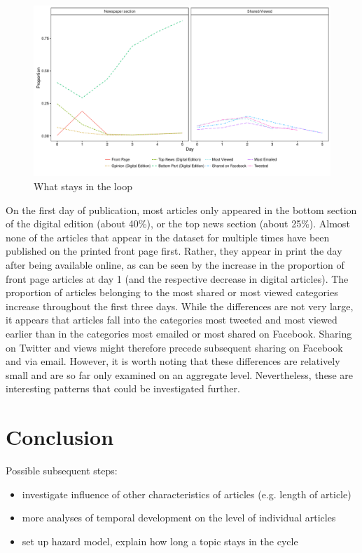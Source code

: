 \documentclass[12pt]{article}
\begin{document}
\begin{doublespace}
\begin{figure}
\caption{What stays in the loop}\label{fig:switch}
\includegraphics[width=\textwidth]{../calc/fig/switch} 
\end{figure}

On the first day of publication, most articles only appeared in the bottom section of the digital edition (about 40\%), or the top news section (about 25\%). Almost none of the articles that appear in the dataset for multiple times have been published on the printed front page first. Rather, they appear in print the day after being available online, as can be seen by the increase in the proportion of front page articles at day 1 (and the respective decrease in digital articles). The proportion of articles belonging to the most shared or most viewed categories increase throughout the first three days. While the differences are not very large, it appears that articles fall into the categories most tweeted and most viewed earlier than in the categories most emailed or most shared on Facebook. Sharing on Twitter and views might therefore precede subsequent sharing on Facebook and via email. However, it is worth noting that these differences are relatively small and are so far only examined on an aggregate level. Nevertheless, these are interesting patterns that could be investigated further.


\section{Conclusion}

\vspace{1em}\noindent Possible subsequent steps:
\begin{itemize}\singlespacing
  \item investigate influence of other characteristics of articles (e.g. length of article)
  \item more analyses of temporal development on the level of individual articles
  \item set up hazard model, explain how long a topic stays in the cycle
\end{itemize}


\clearpage




\end{doublespace}
\end{document}
